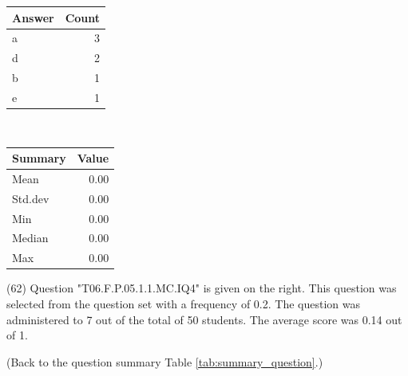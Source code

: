 \documentclass[12pt,english,nohyper]{tufte-handout}\usepackage[]{graphicx}\usepackage[]{color}
\begin{document}
\begin{center}%
\begin{tabular}{lr}
  \hline
Answer & Count \\ 
  \hline
a &   3 \\ 
  d &   2 \\ 
  b &   1 \\ 
  e &   1 \\ 
   \hline
\end{tabular}
~~~~~~~~%
\begin{tabular}{lr}
  \hline
Summary & Value \\ 
  \hline
Mean & 0.00 \\ 
  Std.dev & 0.00 \\ 
  Min & 0.00 \\ 
  Median & 0.00 \\ 
  Max & 0.00 \\ 
   \hline
\end{tabular}
\end{center}\newpage{} (62) Question "T06.F.P.05.1.1.MC.IQ4" is given on the right. This question was selected from the question set with a frequency of 0.2. The question was administered to 7 out of the total of 50 students. The average score was 0.14 out of 1.

 (Back to the question summary Table \ref{tab:summary_question}.)
\end{document}

